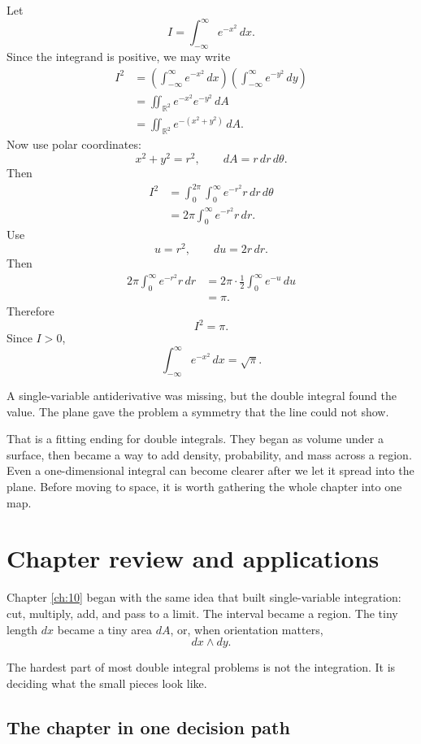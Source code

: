 Let
\[
    I=\int_{-\infty}^{\infty}e^{-x^2}\,dx.
\]
Since the integrand is positive, we may write
\[
\begin{aligned}
I^2
&=
\left(\int_{-\infty}^{\infty}e^{-x^2}\,dx\right)
\left(\int_{-\infty}^{\infty}e^{-y^2}\,dy\right)\\
&=
\iint_{\mathbb R^2} e^{-x^2}e^{-y^2}\,dA\\
&=
\iint_{\mathbb R^2} e^{-(x^2+y^2)}\,dA.
\end{aligned}
\]
Now use polar coordinates:
\[
    x^2+y^2=r^2,
    \qquad
    dA=r\,dr\,d\theta.
\]
Then
\[
\begin{aligned}
I^2
&=
\int_0^{2\pi}\int_0^\infty e^{-r^2}r\,dr\,d\theta\\
&=
2\pi\int_0^\infty e^{-r^2}r\,dr.
\end{aligned}
\]
Use
\[
    u=r^2,
    \qquad
    du=2r\,dr.
\]
Then
\[
\begin{aligned}
2\pi\int_0^\infty e^{-r^2}r\,dr
&=
2\pi\cdot\frac12\int_0^\infty e^{-u}\,du\\
&=
\pi.
\end{aligned}
\]
Therefore
\[
    I^2=\pi.
\]
Since \(I>0\),
\[
\boxed{
    \int_{-\infty}^{\infty}e^{-x^2}\,dx=\sqrt{\pi}.
}
\]

A single-variable antiderivative was missing, but the double integral found the value.
The plane gave the problem a symmetry that the line could not show.

That is a fitting ending for double integrals.  They began as volume under a surface,
then became a way to add density, probability, and mass across a region.  Even a
one-dimensional integral can become clearer after we let it spread into the plane.
Before moving to space, it is worth gathering the whole chapter into one map.

\section{Chapter review and applications}
\label{sec:10.8}

Chapter \ref{ch:10} began with the same idea that built single-variable integration:
cut, multiply, add, and pass to a limit.  The interval became a region.  The tiny length
\(dx\) became a tiny area \(dA\), or, when orientation matters,
\[
    dx\wedge dy.
\]

The hardest part of most double integral problems is not the integration.  It is deciding
what the small pieces look like.

\subsection{The chapter in one decision path}

